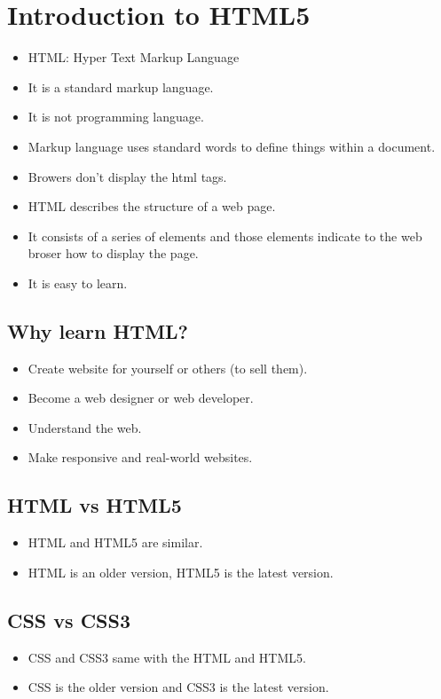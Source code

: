 \section{Introduction to HTML5}
\begin{itemize}
    \item HTML: Hyper Text Markup Language
    \item It is a standard markup language.
    \item It is not programming language.
    \item Markup language uses standard words to define things within a document. 
    \item Browers don't display the html tags.
    \item HTML describes the structure of a web page. 
    \item It consists of a series of elements and those elements indicate to the web broser how to display the page.
    \item It is easy to learn.
\end{itemize}

\subsection{Why learn HTML?}
\begin{itemize}
    \item Create website for yourself or others (to sell them).
    \item Become a web designer or web developer.
    \item Understand the web.
    \item Make responsive and real-world websites.
\end{itemize}

\subsection{HTML vs HTML5}
\begin{itemize}
    \item HTML and HTML5 are similar.
    \item HTML is an older version, HTML5 is the latest version.
\end{itemize}

\subsection{CSS vs CSS3}
\begin{itemize}
    \item CSS and CSS3 same with the HTML and HTML5.
    \item CSS is the older version and CSS3 is the latest version.
\end{itemize}

